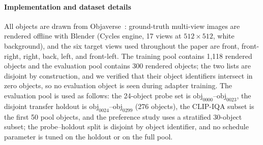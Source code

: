 

\paragraph{Implementation and dataset details}
All objects are drawn from Objaverse~\cite{shao2025mvpainter}: ground-truth multi-view images are rendered offline with Blender (Cycles engine, 17 views at $512\times512$, white background), and the six target views used throughout the paper are front, front-right, right, back, left, and front-left. The training pool contains 1{,}118 rendered objects and the evaluation pool contains 300 rendered objects; the two lists are disjoint by construction, and we verified that their object identifiers intersect in zero objects, so no evaluation object is seen during adapter training. The evaluation pool is used as follows: the 24-object probe set is $\mathrm{obj}_{0000}$--$\mathrm{obj}_{0023}$, the disjoint transfer holdout is $\mathrm{obj}_{0024}$--$\mathrm{obj}_{0299}$ (276 objects), the CLIP-IQA subset is the first 50 pool objects, and the preference study uses a stratified 30-object subset; the probe--holdout split is disjoint by object identifier, and no schedule parameter is tuned on the holdout or on the full pool.

